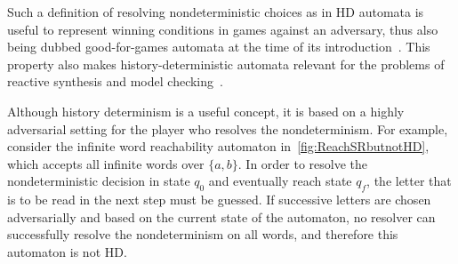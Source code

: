 Such a definition of resolving nondeterministic choices as in HD automata is useful to represent winning conditions in games against an adversary, thus also being dubbed good-for-games automata at the time of its introduction~\cite[Theorem 3.1]{HP06}. This property also makes history-deterministic automata relevant for the problems of reactive synthesis and model checking~\cite[Section 7]{BL23}.

Although history determinism is a useful concept, it is based on a highly adversarial setting for the player who resolves the nondeterminism. 
For example, consider the infinite word reachability automaton in~\cref{fig:ReachSRbutnotHD}, which accepts all infinite words over $\{a,b\}$.
In order to resolve the nondeterministic decision in state $q_0$ and eventually reach state $q_f$, the letter that is to be read in the next step must be guessed.  
If successive letters are chosen adversarially and based on the current state of the automaton, no resolver can successfully resolve the nondeterminism on all words, and therefore this automaton is not HD. 
